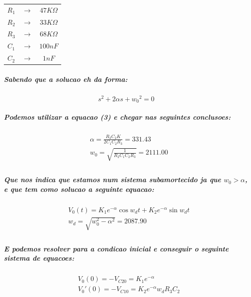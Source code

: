 \documentclass[12pt,twoside, a4paper, twocolumn]{article}
\begin{document}
\begin{center}
    \begin{tabular}{ |ccc| }
        \hline
        $R_1$ & $\rightarrow$ & $47K\varOmega$ \\
        $R_2$ & $\rightarrow$ & $33K\varOmega$ \\
        $R_3$ & $\rightarrow$ & $68K\varOmega$ \\
        $C_1$ & $\rightarrow$ & $100nF$        \\
        $C_2$ & $\rightarrow$ & $1nF$          \\

        \hline
    \end{tabular}
\end{center}

\subparagraph*{Sabendo que a solucao eh da forma:}

\begin{equation*}
    s^2 + 2 \alpha s + w_0{^2} = 0
\end{equation*}

\subparagraph*{Podemos utilizar a equacao (3) e chegar nas seguintes conclusoes:}

\begin{equation}
    \begin{aligned}
         & \alpha = \frac{R_3 C_2 K }{2 C_1 C_2 R_3} = 331.43 \\
         & w_0 = \sqrt{ \frac{1}{R_2 C_1 C_2 R_3}}= 2111.00   \\
    \end{aligned}
\end{equation}

\subparagraph*{Que nos indica que estamos num sistema subamortecido ja que $w_0 > \alpha$, e que tem como solucao a seguinte equacao:}

\begin{equation}
    \begin{aligned}
         & V_0(t) = K_1 e^{-\alpha} \cos{w_d t} + K_2 e^{-\alpha} \sin{w_d t} \\
         & w_d = \sqrt{w_0^2 - \alpha^2} = 2087.90                            \\
    \end{aligned}
\end{equation}

\subparagraph*{E podemos resolver para a condicao inicial e conseguir o seguinte sistema de equacoes:}

\begin{equation}
    \begin{aligned}
         & V_0(0) = -V_{C20} = K_1 e^{-\alpha}              \\
         & V_0'(0) = -V_{C10} = K_2 e^{-\alpha} w_d R_3 C_2
    \end{aligned}
\end{equation}
\end{document}
